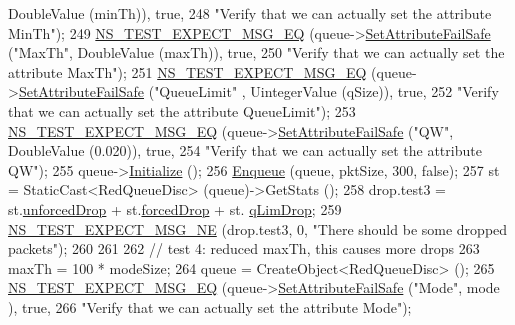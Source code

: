 \begin{DoxyCode}
      DoubleValue (minTh)), \textcolor{keyword}{true},
248                          \textcolor{stringliteral}{"Verify that we can actually set the attribute MinTh"});
249   \hyperlink{group__testing_ga7304ba46a28d8cf08dfdfd6499cf7068}{NS\_TEST\_EXPECT\_MSG\_EQ} (queue->\hyperlink{classns3_1_1ObjectBase_aa7d333004e970f925a4ed5df275541b5}{SetAttributeFailSafe} (\textcolor{stringliteral}{"MaxTh"}, 
      DoubleValue (maxTh)), \textcolor{keyword}{true},
250                          \textcolor{stringliteral}{"Verify that we can actually set the attribute MaxTh"});
251   \hyperlink{group__testing_ga7304ba46a28d8cf08dfdfd6499cf7068}{NS\_TEST\_EXPECT\_MSG\_EQ} (queue->\hyperlink{classns3_1_1ObjectBase_aa7d333004e970f925a4ed5df275541b5}{SetAttributeFailSafe} (\textcolor{stringliteral}{"QueueLimit"}
      , UintegerValue (qSize)), \textcolor{keyword}{true},
252                          \textcolor{stringliteral}{"Verify that we can actually set the attribute QueueLimit"});
253   \hyperlink{group__testing_ga7304ba46a28d8cf08dfdfd6499cf7068}{NS\_TEST\_EXPECT\_MSG\_EQ} (queue->\hyperlink{classns3_1_1ObjectBase_aa7d333004e970f925a4ed5df275541b5}{SetAttributeFailSafe} (\textcolor{stringliteral}{"QW"}, 
      DoubleValue (0.020)), \textcolor{keyword}{true},
254                          \textcolor{stringliteral}{"Verify that we can actually set the attribute QW"});
255   queue->\hyperlink{classns3_1_1Object_af4411cb29971772fcd09203474a95078}{Initialize} ();
256   \hyperlink{classRedQueueDiscTestCase_a231b433374e4485d83bcca3088685e31}{Enqueue} (queue, pktSize, 300, \textcolor{keyword}{false});
257   st = StaticCast<RedQueueDisc> (queue)->GetStats ();
258   drop.test3 = st.\hyperlink{structns3_1_1RedQueueDisc_1_1Stats_a242027f6eb7d30e2cd636c52080e2c73}{unforcedDrop} + st.\hyperlink{structns3_1_1RedQueueDisc_1_1Stats_a56951fa215564c8d2e59aa046dc3e494}{forcedDrop} + st.
      \hyperlink{structns3_1_1RedQueueDisc_1_1Stats_a2374b8b8386ad6e42435bf1b29109bad}{qLimDrop};
259   \hyperlink{group__testing_ga6d4b162d26b8a930115b97dd5f3d9ed9}{NS\_TEST\_EXPECT\_MSG\_NE} (drop.test3, 0, \textcolor{stringliteral}{"There should be some dropped packets"});
260 
261 
262   \textcolor{comment}{// test 4: reduced maxTh, this causes more drops}
263   maxTh = 100 * modeSize;
264   queue = CreateObject<RedQueueDisc> ();
265   \hyperlink{group__testing_ga7304ba46a28d8cf08dfdfd6499cf7068}{NS\_TEST\_EXPECT\_MSG\_EQ} (queue->\hyperlink{classns3_1_1ObjectBase_aa7d333004e970f925a4ed5df275541b5}{SetAttributeFailSafe} (\textcolor{stringliteral}{"Mode"}, mode
      ), \textcolor{keyword}{true},
266                          \textcolor{stringliteral}{"Verify that we can actually set the attribute Mode"});

\end{DoxyCode}
